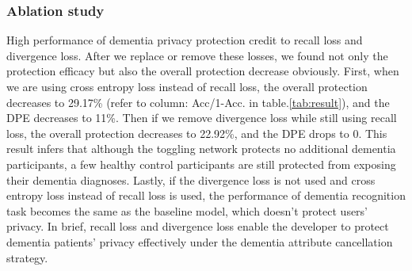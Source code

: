\documentclass[lettersize,journal]{IEEEtran}
\begin{document}
\subsubsection{Ablation study}
High performance of dementia privacy protection credit to recall loss and divergence loss. After we replace or remove these losses, we found not only the protection efficacy but also the overall protection decrease obviously. First, when we are using cross entropy loss instead of recall loss, the overall protection decreases to 29.17\% (refer to column: Acc/1-Acc. in table.\ref{tab:result}), and the DPE decreases to 11\%. Then if we remove divergence loss while still using recall loss, the overall protection decreases to 22.92\%, and the DPE drops to 0. This result infers that although the toggling network protects no additional dementia participants, a few healthy control participants are still protected from exposing their dementia diagnoses. Lastly, if the divergence loss is not used and cross entropy loss instead of recall loss is used, the performance of dementia recognition task becomes the same as the baseline model, which doesn't protect users' privacy. In brief, recall loss and divergence loss enable the developer to protect dementia patients' privacy effectively under the dementia attribute cancellation strategy.
\end{document}
